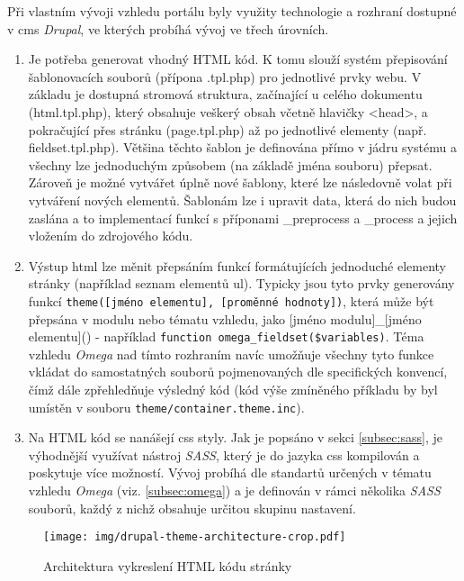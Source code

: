 Při vlastním vývoji vzhledu portálu byly využity technologie a rozhraní dostupné v \gls{cms} \emph{Drupal}, ve kterých probíhá vývoj ve třech úrovních.

\begin{enumerate}
  \item Je potřeba generovat vhodný HTML kód. K tomu slouží systém přepisování šablonovacích souborů (přípona .tpl.php) pro jednotlivé prvky webu. V základu je dostupná stromová struktura, začínající u celého dokumentu (html.tpl.php), který obsahuje veškerý obsah včetně hlavičky <head>, a pokračující přes stránku (page.tpl.php) až po jednotlivé elementy (např. fieldset.tpl.php). Většina těchto šablon je definována přímo v jádru systému a všechny lze jednoduchým způsobem (na základě jména souboru) přepsat. Zároveň je možné vytvářet úplně nové šablony, které lze následovně volat při vytváření nových elementů. Šablonám lze i upravit data, která do nich budou zaslána a to implementací funkcí s příponami \_preprocess a \_process a jejich vložením do zdrojového kódu. 
  
  \item Výstup html lze měnit přepsáním funkcí formátujících jednoduché elementy stránky (například seznam elementů ul). Typicky jsou tyto prvky generovány funkcí \texttt{theme([jméno elementu], [proměnné hodnoty])}, která může být přepsána v modulu nebo tématu vzhledu, jako [jméno modulu]\_[jméno elementu]() - například \texttt{function omega\_fieldset(\$variables)}. Téma vzhledu \emph{Omega} nad tímto rozhraním navíc umožňuje všechny tyto funkce vkládat do samostatných souborů pojmenovaných dle specifických konvencí, čímž dále zpřehledňuje výsledný kód (kód výše zmíněného příkladu by byl umístěn v souboru \texttt{theme/container.theme.inc}).
  \item Na HTML kód se nanášejí \gls{css} styly. Jak je popsáno v sekci \ref{subsec:sass}, je výhodnější využívat nástroj \emph{SASS}, který je do jazyka \gls{css} kompilován a poskytuje více možností. Vývoj probíhá dle standartů určených v tématu vzhledu \emph{Omega} (viz. \ref{subsec:omega}) a je definován v rámci několika \emph{SASS} souborů, každý z nichž obsahuje určitou skupinu nastavení.
\end{enumerate}

\begin{figure}[]
  \texttt{[image: img/drupal-theme-architecture-crop.pdf]}
  \caption{Architektura vykreslení HTML kódu stránky}
  \label{fig:theme_architecture}
\end{figure}  

